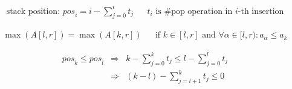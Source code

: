 \begin{eqnarray}  \label{fun:rmq-stack-pos}
	\text{stack position: } \textit{pos}_i = i - \sum_{j=0}^{i} t_j && t_i \text{ is \#pop operation in $i$-th insertion}
\end{eqnarray}

\begin{eqnarray}  \label{fun:rmq-reduction}
	\max(A[l, r]) = \max(A[k, r])
		&& \text{if } k \in [l, r]\text{ and } \forall \alpha \in [l, r): a_\alpha \le a_k
\end{eqnarray}

\begin{eqnarray}  \label{fun:rmq-reduction-compute}
	\textit{pos}_k \le \textit{pos}_l 
		&\Rightarrow& k - \sum_{j=0}^{k} t_j \le l - \sum_{j=0}^{l} t_j \\
		&\Rightarrow& (k-l) - \sum_{j=l+1}^{k} t_j \le 0
\end{eqnarray}

